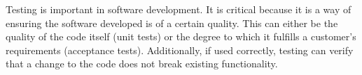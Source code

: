 Testing is important in software development. It is critical because it is a way of ensuring the software developed is of a certain quality. This can either be the quality of the code itself (unit tests) or the degree to which it fulfills a customer's requirements (acceptance tests). Additionally, if used correctly, testing can verify that a change to the code does not break existing functionality.


